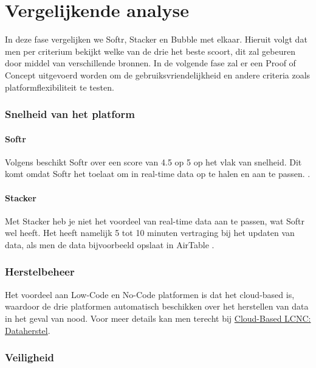 \section*{Vergelijkende analyse}
\label{sec:vergelijkende-analyse} 
In deze fase vergelijken we Softr, Stacker en Bubble met elkaar.
Hieruit volgt dat men per criterium bekijkt welke van de drie het beste scoort, dit zal gebeuren door middel van verschillende bronnen.
In de volgende fase zal er een Proof of Concept uitgevoerd worden om de gebruiksvriendelijkheid en andere criteria zoals platformflexibiliteit te testen.

\subsubsection*{Snelheid van het platform}
\paragraph{Softr}
Volgens \textcite{Code2023} 
beschikt Softr over een score van 4.5 op 5 op het vlak van snelheid. 
Dit komt omdat Softr het toelaat om in real-time data op te halen en aan te passen. \autocite{Youssef2023}.
\paragraph{Stacker}
Met Stacker heb je niet het voordeel van real-time data aan te passen, wat Softr wel heeft.
 Het heeft namelijk 5 tot 10 minuten vertraging bij het updaten van data, als men de data bijvoorbeeld opslaat in AirTable \autocite{Youssef2023}.

\subsubsection*{Herstelbeheer}
Het voordeel aan Low-Code en No-Code platformen is dat het cloud-based is, waardoor de drie platformen automatisch beschikken over het herstellen van data in het geval van nood. 
Voor meer details kan men terecht bij \hyperref[subsec:cloud-based-lcnc]{Cloud-Based LCNC: Dataherstel}.
\subsubsection*{Veiligheid}

